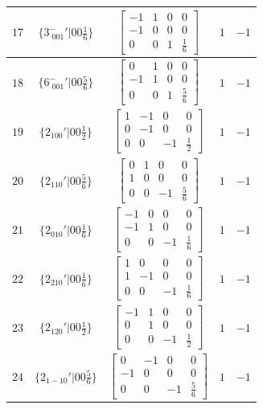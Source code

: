 \documentclass[fleqn,8pt]{jsarticle}
\begin{document}
\begin{longtable}{ccccc}
$ 17 $ & $ \{3^{-}_{\,\,001}{}'|0 0 \frac{1}{6}\} $ & $ \begin{bmatrix} -1 & 1 & 0 & 0 \\ -1 & 0 & 0 & 0 \\ 0 & 0 & 1 & \frac{1}{6} \end{bmatrix} $ & $ 1 $ & $ -1 $ \\ \hline
$ 18 $ & $ \{6^{-}_{\,\,001}{}'|0 0 \frac{5}{6}\} $ & $ \begin{bmatrix} 0 & 1 & 0 & 0 \\ -1 & 1 & 0 & 0 \\ 0 & 0 & 1 & \frac{5}{6} \end{bmatrix} $ & $ 1 $ & $ -1 $ \\ \hline
$ 19 $ & $ \{2{}_{100}{}'|0 0 \frac{1}{2}\} $ & $ \begin{bmatrix} 1 & -1 & 0 & 0 \\ 0 & -1 & 0 & 0 \\ 0 & 0 & -1 & \frac{1}{2} \end{bmatrix} $ & $ 1 $ & $ -1 $ \\ \hline
$ 20 $ & $ \{2{}_{110}{}'|0 0 \frac{5}{6}\} $ & $ \begin{bmatrix} 0 & 1 & 0 & 0 \\ 1 & 0 & 0 & 0 \\ 0 & 0 & -1 & \frac{5}{6} \end{bmatrix} $ & $ 1 $ & $ -1 $ \\ \hline
$ 21 $ & $ \{2{}_{010}{}'|0 0 \frac{1}{6}\} $ & $ \begin{bmatrix} -1 & 0 & 0 & 0 \\ -1 & 1 & 0 & 0 \\ 0 & 0 & -1 & \frac{1}{6} \end{bmatrix} $ & $ 1 $ & $ -1 $ \\ \hline
$ 22 $ & $ \{2{}_{210}{}'|0 0 \frac{1}{6}\} $ & $ \begin{bmatrix} 1 & 0 & 0 & 0 \\ 1 & -1 & 0 & 0 \\ 0 & 0 & -1 & \frac{1}{6} \end{bmatrix} $ & $ 1 $ & $ -1 $ \\ \hline
$ 23 $ & $ \{2{}_{120}{}'|0 0 \frac{1}{2}\} $ & $ \begin{bmatrix} -1 & 1 & 0 & 0 \\ 0 & 1 & 0 & 0 \\ 0 & 0 & -1 & \frac{1}{2} \end{bmatrix} $ & $ 1 $ & $ -1 $ \\ \hline
$ 24 $ & $ \{2{}_{1-10}{}'|0 0 \frac{5}{6}\} $ & $ \begin{bmatrix} 0 & -1 & 0 & 0 \\ -1 & 0 & 0 & 0 \\ 0 & 0 & -1 & \frac{5}{6} \end{bmatrix} $ & $ 1 $ & $ -1 $ \\
\end{longtable}
\end{document}
